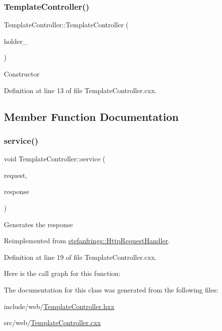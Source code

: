 \subsubsection{\texorpdfstring{Template\+Controller()}{TemplateController()}}
{\footnotesize\ttfamily Template\+Controller\+::\+Template\+Controller (\begin{DoxyParamCaption}\item[{\mbox{\hyperlink{classeven_1_1_template_holder}{Template\+Holder}} $\ast$}]{holder\+\_\+ }\end{DoxyParamCaption})}

Constructor 

Definition at line 13 of file Template\+Controller.\+cxx.



\subsection{Member Function Documentation}
\mbox{\label{classeven_1_1_template_controller_ad34c48cf60094e0deb73aa7145e93eac}} 
\subsubsection{\texorpdfstring{service()}{service()}}
{\footnotesize\ttfamily void Template\+Controller\+::service (\begin{DoxyParamCaption}\item[{\mbox{\hyperlink{classstefanfrings_1_1_http_request}{Http\+Request}} \&}]{request,  }\item[{\mbox{\hyperlink{classstefanfrings_1_1_http_response}{Http\+Response}} \&}]{response }\end{DoxyParamCaption})\hspace{0.3cm}{\ttfamily [virtual]}}

Generates the response 

Reimplemented from \mbox{\hyperlink{classstefanfrings_1_1_http_request_handler_a0a7210907152c46b8b5a47feb64cf6bd}{stefanfrings\+::\+Http\+Request\+Handler}}.



Definition at line 19 of file Template\+Controller.\+cxx.

Here is the call graph for this function\+:


The documentation for this class was generated from the following files\+:\begin{DoxyCompactItemize}
\item 
include/web/\mbox{\hyperlink{_template_controller_8hxx}{Template\+Controller.\+hxx}}\item 
src/web/\mbox{\hyperlink{_template_controller_8cxx}{Template\+Controller.\+cxx}}\end{DoxyCompactItemize}
